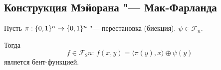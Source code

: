 

       
       

\subsection{Конструкция Мэйорана "--- Мак-Фарланда}

\begin{theorem}
Пусть $\pi: \{0,1\}^n \to \{0,1\}^n$ "--- перестановка (биекция). $\psi \in\mathscr{F}_n$.

Тогда 
$$f \in \mathscr{F}_2n:\, f(x,y) = \langle \pi(y), x \rangle \oplus \psi(y)$$
является бент-функцией.
\end{theorem}

